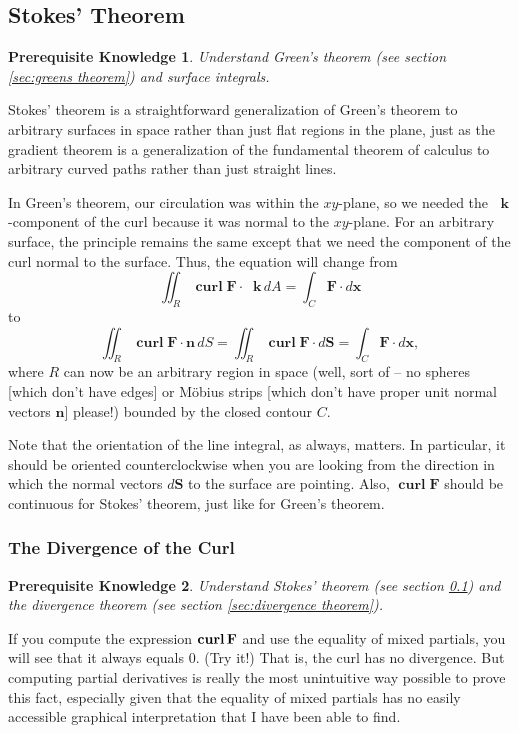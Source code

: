 \documentclass{myarticle}
\let\div\relax
\DeclareMathOperator{\div}{div}
\DeclareMathOperator{\curl}{\mathbf{curl}}
\renewcommand{\vec}[1]{\mathbf{#1}}
\newcommand{\unitvector}[1]{
  \mathop{}\!\vec{#1}
}
\newcommand{\kh}{\unitvector{k}}
\theoremstyle{nospace}
\newtheorem*{oldprereq}{Prerequisite Knowledge}
\newenvironment{prereq}{\begin{mdframed}\begin{oldprereq}}{\end{oldprereq}\end{mdframed}}
\newtheorem{old series theorem}{Theorem}
\newenvironment{series theorem}{\begin{mdframed}\begin{old series theorem}}{\end{old series theorem}\end{mdframed}}
\begin{document}
\subsection{Stokes' Theorem} \label{sec:stokes theorem}

\begin{prereq} Understand Green's theorem (see section \ref{sec:greens theorem}) and surface integrals. \end{prereq}

Stokes' theorem is a straightforward generalization of Green's theorem to arbitrary surfaces in space rather than just flat regions in the plane, just as the gradient theorem is a generalization of the fundamental theorem of calculus to arbitrary curved paths rather than just straight lines.

In Green's theorem, our circulation was within the $xy$-plane, so we needed the $\kh$-component of the curl because it was normal to the $xy$-plane. For an arbitrary surface, the principle remains the same except that we need the component of the curl normal to the surface. Thus, the equation will change from \[ \iint_R \curl \vec{F} \cdot \kh \,dA = \int_C \vec{F} \cdot d\vec{x} \] to \[ \iint_R \curl \vec{F} \cdot \vec{n} \,dS = \iint_R \curl \vec{F} \cdot d\vec{S} = \int_C \vec{F} \cdot d\vec{x}, \] where $R$ can now be an arbitrary region in space (well, sort of -- no spheres [which don't have edges] or M\"obius strips [which don't have proper unit normal vectors $\vec{n}$] please!) bounded by the closed contour $C$.

Note that the orientation of the line integral, as always, matters. In particular, it should be oriented counterclockwise when you are looking from the direction in which the normal vectors $d\vec{S}$ to the surface are pointing. Also, $\curl \vec{F}$ should be continuous for Stokes' theorem, just like for Green's theorem.

\subsubsection{The Divergence of the Curl} \label{sec:divergence of curl}

\begin{prereq} Understand Stokes' theorem (see section \ref{sec:stokes theorem}) and the divergence theorem (see section \ref{sec:divergence theorem}). \end{prereq}

If you compute the expression $\div \curl \vec{F}$ and use the equality of mixed partials, you will see that it always equals $0$. (Try it!) That is, the curl has no divergence. But computing partial derivatives is really the most unintuitive way possible to prove this fact, especially given that the equality of mixed partials has no easily accessible graphical interpretation that I have been able to find.
\end{document}
